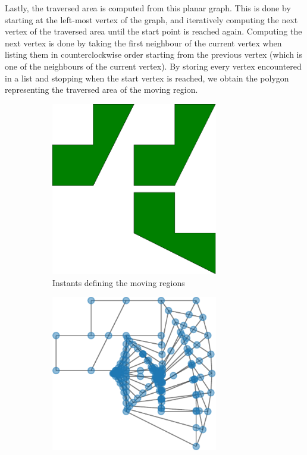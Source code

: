 Lastly, the traversed area is computed from this planar graph. This is done by starting at the left-most vertex of the graph, and iteratively computing the next vertex of the traversed area until the start point is reached again. Computing the next vertex is done by taking the first neighbour of the current vertex when listing them in counterclockwise order starting from the previous vertex (which is one of the neighbours of the current vertex). By storing every vertex encountered in a list and stopping when the start vertex is reached, we obtain the polygon representing the traversed area of the moving region.

\begin{figure}[h!]
    \centering
    \begin{subfigure}{.3\textwidth}
        \centering
        \includegraphics[width=0.8\textwidth]{images/process_regions.pdf}
        \caption{Instants defining the moving regions}
    \end{subfigure}
    \hfill
    \begin{subfigure}{.3\textwidth}
        \centering
        \includegraphics[width=0.8\textwidth]{images/process_planar_graph.pdf}

\end{subfigure}
\end{figure}
